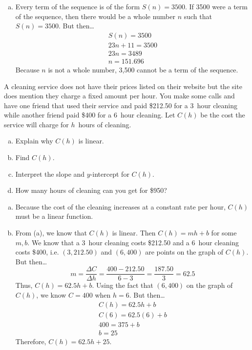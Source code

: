 \documentclass[12pt,letterpaper]{exam}
\begin{document}
\begin{questions}
\begin{enumerate}[(a)]
\item Every term of the sequence is of the form $S(n)= 3500$. If 3500 were a term of the sequence, then there would be a whole number $n$ such that $S(n)= 3500$. But then\dots
	\[
	\begin{gathered}
	S(n)= 3500 \\
	23n + 11= 3500 \\
	23n= 3489 \\
	n= 151.696
	\end{gathered}
	\]
Because $n$ is not a whole number, 3,500 cannot be a term of the sequence. 
\end{enumerate}



\newpage
\question[10] A cleaning service does not have their prices listed on their website but the site does mention they charge a fixed amount per hour. You make some calls and have one friend that used their service and paid \$212.50 for a 3~hour cleaning while another friend paid \$400 for a 6~hour cleaning. Let $C(h)$ be the cost the service will charge for $h$~hours of cleaning.
	\begin{enumerate}[(a)]
	\item Explain why $C(h)$ is linear.
	\item Find $C(h)$.
	\item Interpret the slope and $y$-intercept for $C(h)$.
	\item How many hours of cleaning can you get for \$950?
	\end{enumerate} 

\sol 
\begin{enumerate}[(a)]
\item Because the cost of the cleaning increases at a constant rate per hour, $C(h)$ must be a linear function. 

\item From (a), we know that $C(h)$ is linear. Then $C(h)= mh + b$ for some $m, b$. We know that a 3~hour cleaning costs \$212.50 and a 6~hour cleaning costs \$400, i.e. $(3, 212.50)$ and $(6, 400)$ are points on the graph of $C(h)$. But then\dots
	\[
	m= \dfrac{\Delta C}{\Delta h}= \dfrac{400 - 212.50}{6 - 3}= \dfrac{187.50}{3}= 62.5
	\]
Thus, $C(h)= 62.5h + b$. Using the fact that $(6, 400)$ on the graph of $C(h)$, we know $C= 400$ when $h= 6$. But then\dots
	\[
	\begin{gathered}
	C(h)= 62.5h + b \\
	C(6)= 62.5(6) + b \\
	400= 375 + b \\
	b= 25
	\end{gathered}
	\]
Therefore, $C(h)= 62.5h + 25$. \pspace


\end{enumerate}
\end{questions}
\end{document}
